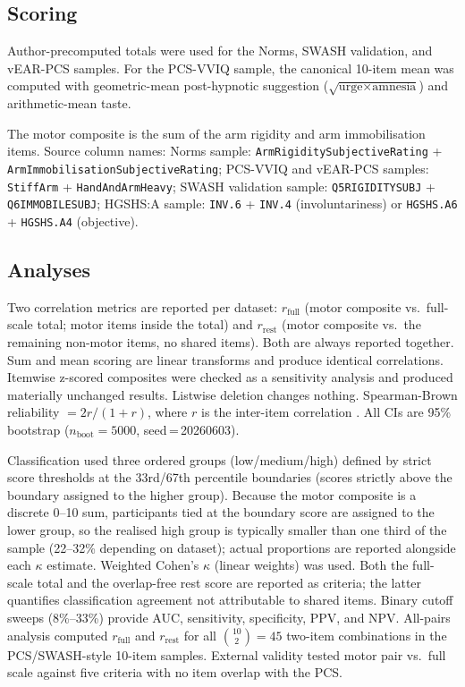\documentclass[12pt,a4paper]{article}
\begin{document}
\subsection{Scoring}

Author-precomputed totals were used for the Norms, SWASH validation, and
vEAR-PCS samples. For the PCS-VVIQ sample, the canonical 10-item mean was
computed with geometric-mean post-hypnotic suggestion
($\sqrt{\text{urge} \times \text{amnesia}}$) and arithmetic-mean taste.

The motor composite is the sum of the arm rigidity and arm immobilisation
items. Source column names: Norms sample: \texttt{ArmRigidity\-Subjective\-Rating}
+ \texttt{ArmImmobilisation\-Subjective\-Rating}; PCS-VVIQ and vEAR-PCS samples:
\texttt{StiffArm} + \texttt{HandAndArmHeavy}; SWASH validation sample:
\texttt{Q5RIGIDITYSUBJ} + \texttt{Q6IMMOBILESUBJ}; HGSHS:A sample:
\texttt{INV.6} + \texttt{INV.4} (involuntariness) or \texttt{HGSHS.A6} +
\texttt{HGSHS.A4} (objective).

\subsection{Analyses}

Two correlation metrics are reported per dataset: $r_{\text{full}}$ (motor
composite vs.\ full-scale total; motor items inside the total) and
$r_{\text{rest}}$ (motor composite vs.\ the remaining non-motor items, no
shared items). Both are always reported together. Sum and mean scoring are linear transforms and produce identical
correlations. Itemwise z-scored composites were checked as a sensitivity
analysis and produced materially unchanged results. Listwise deletion
changes nothing. Spearman-Brown reliability $= 2r/(1+r)$, where $r$ is
the inter-item correlation \citep{eisinga2013spearman}. All CIs are 95\%
bootstrap ($n_{\text{boot}} = 5000$, seed\,=\,20260603).

Classification used three ordered groups (low/medium/high) defined by strict
score thresholds at the 33rd/67th percentile boundaries (scores strictly above
the boundary assigned to the higher group). Because the motor composite is a
discrete 0--10 sum, participants tied at the boundary score are assigned to the
lower group, so the realised high group is typically smaller than one third of
the sample (22--32\% depending on dataset); actual proportions are reported
alongside each $\kappa$ estimate. Weighted Cohen's $\kappa$ (linear weights) was used. Both the full-scale total and the overlap-free
rest score are reported as criteria; the latter quantifies classification
agreement not attributable to shared items. Binary cutoff sweeps (8\%--33\%)
provide AUC, sensitivity, specificity, PPV, and NPV. All-pairs analysis computed $r_{\text{full}}$ and $r_{\text{rest}}$ for all
$\binom{10}{2} = 45$ two-item combinations in the PCS/SWASH-style 10-item
samples. External validity tested motor pair vs.\
full scale against five criteria with no item overlap with the PCS.
\end{document}
